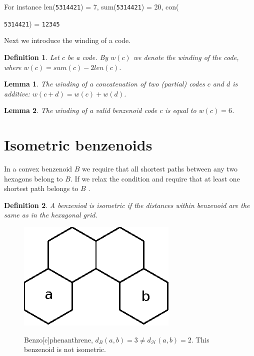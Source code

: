 \documentclass[a4paper,10pt]{article}
\newcounter{theorem}
\newtheorem{definition}{Definition}[section]
\newtheorem{lemma}{Lemma}[theorem]
\newcommand\Tomo[1]{\textcolor{brown}{Tomo: #1}}
\begin{document}
For instance len({\tt 5314421}) = 7, sum({\tt 5314421}) = 20, con({{\tt 5314421}) = {\tt 12345}

Next we introduce the winding of a code.
\begin{definition}
Let $c$ be a code. By $w(c)$ we denote the winding of the code, where $w(c) = sum(c)-2len(c)$.
\end{definition}

\begin{lemma}
The winding of a concatenation of two (partial) codes $c$  and $d$ is additive: $w(c+d) = w(c)+w(d)$. 
\end{lemma}

\begin{lemma}
The winding of a valid benzenoid code $c$ is equal to $w(c) = 6$. 
\end{lemma}



\section{Isometric benzenoids}

In a convex benzenoid $B$ we require that all shortest paths between any two hexagons belong to $B$. If we relax the condition and require that at least one shortest path belongs to $B$ .

\begin{definition}
\label{def:isometric}
A benzeniod is isometric if the distances within benzenoid are the same as in the hexagonal grid.
\end{definition}



\begin{figure}
\centering
 \includegraphics{figures/fig2}
 \label{fig2}
 \caption{Benzo[c]phenanthrene, $d_B(a, b) = 3 \neq d_{\mathcal{H}}(a, b) = 2$. This benzenoid is not isometric.}
\end{figure}

}
\end{document}

